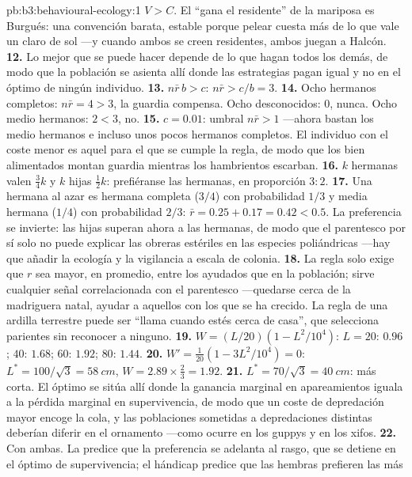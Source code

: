 \begin{solution}{pb:b3:behavioural-ecology:1}
$V > C$. El ``gana el residente'' de la mariposa es Burgués: una
convención barata, estable porque pelear cuesta más de lo que vale un
claro de sol ---y cuando ambos se creen residentes, ambos juegan a
Halcón.
\textbf{12.} Lo mejor que se puede hacer depende de lo que hagan todos
los demás, de modo que la población se asienta allí donde las
estrategias pagan igual y no en el óptimo de ningún individuo.
\textbf{13.} $n\bar r\,b > c$: $n\bar r > c/b = 3$.
\textbf{14.} Ocho hermanos completos: $n\bar r = 4 > 3$, la guardia
compensa. Ocho desconocidos: $0$, nunca. Ocho medio hermanos: $2 < 3$,
no.
\textbf{15.} $c = 0.01$: umbral $n\bar r > 1$ ---ahora bastan los medio
hermanos e incluso unos pocos hermanos completos. El individuo con el
coste menor es aquel para el que se cumple la regla, de modo que los
bien alimentados montan guardia mientras los hambrientos escarban.
\textbf{16.} $k$ hermanas valen $\tfrac{3}{4}k$ y $k$ hijas
$\tfrac{1}{2}k$: prefiéranse las hermanas, en proporción $3{:}2$.
\textbf{17.} Una hermana al azar es hermana completa ($3/4$) con
probabilidad $1/3$ y media hermana ($1/4$) con probabilidad $2/3$: $\bar r = 0.25 +
0.17 = 0.42 < 0.5$. La preferencia se invierte: las hijas superan ahora
a las hermanas, de modo que el parentesco por sí solo no puede explicar
las obreras estériles en las especies poliándricas ---hay que añadir la
ecología y la vigilancia a escala de colonia.
\textbf{18.} La regla solo exige que $r$ sea mayor, en promedio, entre
los ayudados que en la población; sirve cualquier señal correlacionada
con el parentesco ---quedarse cerca de la madriguera natal, ayudar a
aquellos con los que se ha crecido. La regla de una ardilla terrestre
puede ser ``llama cuando estés cerca de casa'', que selecciona parientes
sin reconocer a ninguno.
\textbf{19.} $W = (L/20)(1 - L^{2}/10^{4})$: $L = 20$: $0.96$; $40$:
$1.68$; $60$: $1.92$; $80$: $1.44$.
\textbf{20.} $W' = \tfrac{1}{20}(1 - 3L^{2}/10^{4}) = 0$: $L^{*} = 100/\sqrt{3}
= \qty{58}{cm}$, $W = 2.89\times\tfrac{2}{3} = 1.92$.
\textbf{21.} $L^{*} = 70/\sqrt{3} = \qty{40}{cm}$: más corta. El óptimo
se sitúa allí donde la ganancia marginal en apareamientos iguala a la
pérdida marginal en supervivencia, de modo que un coste de depredación
mayor encoge la cola, y las poblaciones sometidas a depredaciones
distintas deberían diferir en el ornamento ---como ocurre en los
guppys y en los xifos.
\textbf{22.} Con ambas. La  predice que la
preferencia se adelanta al rasgo, que se detiene en el óptimo de
supervivencia; el hándicap predice que las hembras prefieren las más

\end{solution}
